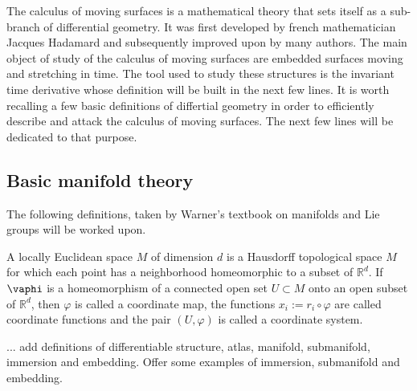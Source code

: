 \documentclass[../main.tex]{subfiles}
\begin{document}
    The calculus of moving surfaces is a mathematical theory that sets itself as a sub-branch of differential geometry. It was first developed by french mathematician Jacques Hadamard and subsequently improved upon by many authors. The main object of study of the calculus of moving surfaces are embedded surfaces moving and stretching in time. The tool used to study these structures is the invariant time derivative whose definition will be built in the next few lines. It is worth recalling a few basic definitions of differtial geometry in order to efficiently describe and attack the calculus of moving surfaces. The next few lines will be dedicated to that purpose.
    
    \subsection{Basic manifold theory}
    The following definitions, taken by Warner's textbook on manifolds and Lie groups \cite{warner2013foundations} will be worked upon. 
    \begin{dfn}
        A locally Euclidean space $M$ of dimension $d$ is a Hausdorff topological space $M$ for which each point has a neighborhood homeomorphic to a subset of $\mathbb{R}^{d}$.  If $\vaphi$ is a homeomorphism of a connected open set $U \subset M$ onto an open subset of $\mathbb{R}^{d}$, then $\varphi$ is called a coordinate map, the functions $x_i:=r_{i}\circ \varphi$ are called coordinate functions and the pair $(U,\varphi)$ is called a coordinate system.
    \end{dfn}
    ... add definitions of differentiable structure, atlas, manifold, submanifold, immersion and embedding. Offer some examples of immersion, submanifold and embedding.
    
\end{document}
